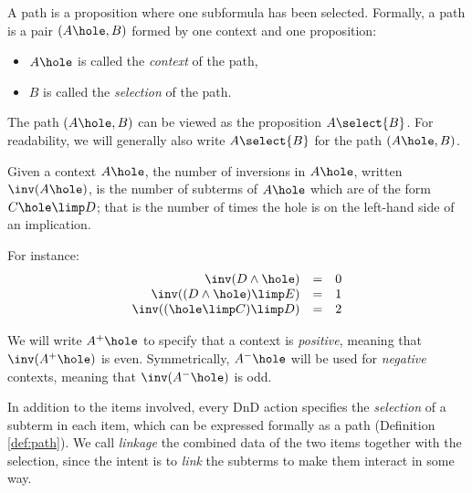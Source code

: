 \begin{definition}[Path]\label{def:path}
A path is a proposition where one subformula has been
selected. Formally, a path is a pair $(A\hole, B)$ formed by one
context and one proposition:
\begin{itemize}
\item $A\hole$ is called the {\em context} of the path,
\item $B$ is called the {\em selection} of the path.
\end{itemize}

The path $(A\hole, B)$ can be viewed as the proposition
$A\select{B}$.  For readability, we will generally also write
$A\select{B}$ for the path $(A\hole, B)$.
\end{definition}

\begin{definition}[Inversions]
  Given a context $A\hole$, the number of inversions in $A\hole$,
  written $\inv(A\hole)$, is the number of subterms of $A\hole$
  which are of the form $C\hole\limp D$; that is the number of
  times the hole is on the left-hand side of an implication.
  \end{definition}
\noindent  For instance:
  $$
\begin{array}{rcl}
    \inv(D\land \hole)&=& 0\\
    \inv((D\land \hole)\limp E)&=&1\\
    \inv((\hole\limp C)\limp D) &=& 2
\end{array}
$$

\begin{definition}\label{def:polarity}
We will write $A^+\hole$ to specify that a context is {\em positive},
meaning that $\inv(A^+\hole)$ is even. Symmetrically, $A^-\hole$ will be
used for {\em negative} contexts, meaning that $\inv(A^-\hole)$ is odd.
\end{definition}


In addition to the items involved, every DnD action specifies the
\emph{selection} of a subterm in each item, which can be expressed formally as a
path (Definition \ref{def:path}). We call \emph{linkage} the combined data of
the two items together with the selection, since the intent is to \emph{link}
the subterms to make them interact in some way.

